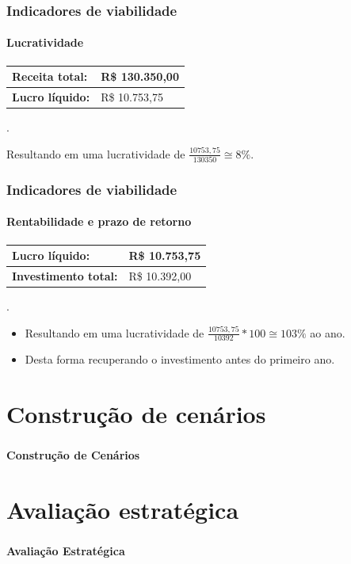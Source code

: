 \documentclass{beamer}
\begin{document}
\begin{frame}
  \frametitle{Indicadores de viabilidade}
  \framesubtitle{Lucratividade}

  \begin{tabular}{| l | l |}
    \hline
    \textbf{Receita total:} & R\$ 130.350,00 \\ \hline
    \textbf{Lucro líquido:} & R\$ 10.753,75 \\ \hline
  \end{tabular}

  .\newline \newline

  Resultando em uma lucratividade de $\frac{10753,75}{130350} \cong 8\%$.
\end{frame}

\begin{frame}
  \frametitle{Indicadores de viabilidade}
  \framesubtitle{Rentabilidade e prazo de retorno}

  \begin{tabular}{| l | l |}
    \hline
    \textbf{Lucro líquido:} & R\$ 10.753,75 \\ \hline
    \textbf{Investimento total:} & R\$ 10.392,00 \\ \hline
  \end{tabular}

  .\newline \newline

  \begin{itemize}
    \item Resultando em uma lucratividade de $\frac{10753,75}{10392}*100 \cong 103\%$ ao ano.
    \item Desta forma recuperando o investimento antes do primeiro ano.
  \end{itemize}
\end{frame}

\section{Construção de cenários}
\begin{frame}
  \frametitle{}
  \framesubtitle{}

  \begin{center}
    {\huge\textbf{Construção de Cenários}}
  \end{center}
\end{frame}

\section{Avaliação estratégica}
\begin{frame}
  \frametitle{}
  \framesubtitle{}

  \begin{center}
    {\huge\textbf{Avaliação Estratégica}}
  \end{center}
\end{frame}
\end{document}
